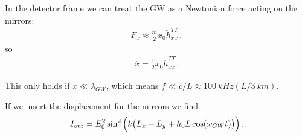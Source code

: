 \documentclass[main.tex]{subfiles}
\begin{document}
In the detector frame we can treat the GW as a Newtonian force acting on the mirrors: 
%
\begin{align}
F_{x} \approx \frac{m}{2} x_0 \ddot{h}_{xx}^{TT} 
\,,
\end{align}
%
so 
%
\begin{align}
\ddot{x} = \frac{1}{2} x_0 \ddot{h}^{TT}_{xx}
\,.
\end{align}

This only holds if \(x \ll \lambda_{GW}\), which means \(f \ll c/ L  \approx \SI{100}{kHz} (L / \SI{3}{km} )\).

If we insert the displacement for the mirrors we find 
%
\begin{align}
I _{\text{out}} = E_0^2 \sin^2 \qty(k \qty(L_x - L_y + h_0 L \cos(\omega_{GW} t)))
\,.
\end{align}
%
\end{document}

